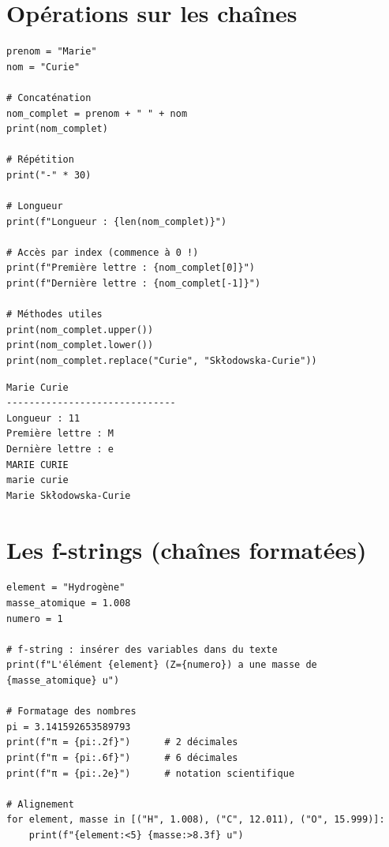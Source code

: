 \section{Op\'erations sur les cha\^ines}

\begin{codeblock}[title=\textbf{Python --- Cha\^ines de caract\`eres}]
\begin{verbatim}
prenom = "Marie"
nom = "Curie"

# Concaténation
nom_complet = prenom + " " + nom
print(nom_complet)

# Répétition
print("-" * 30)

# Longueur
print(f"Longueur : {len(nom_complet)}")

# Accès par index (commence à 0 !)
print(f"Première lettre : {nom_complet[0]}")
print(f"Dernière lettre : {nom_complet[-1]}")

# Méthodes utiles
print(nom_complet.upper())
print(nom_complet.lower())
print(nom_complet.replace("Curie", "Skłodowska-Curie"))
\end{verbatim}
\end{codeblock}

\begin{codeoutput}
\begin{verbatim}
Marie Curie
------------------------------
Longueur : 11
Première lettre : M
Dernière lettre : e
MARIE CURIE
marie curie
Marie Skłodowska-Curie
\end{verbatim}
\end{codeoutput}

\begin{center}
\end{center}

\section{Les f-strings (cha\^ines format\'ees)}

\begin{codeblock}[title=\textbf{Python --- f-strings}]
\begin{verbatim}
element = "Hydrogène"
masse_atomique = 1.008
numero = 1

# f-string : insérer des variables dans du texte
print(f"L'élément {element} (Z={numero}) a une masse de {masse_atomique} u")

# Formatage des nombres
pi = 3.141592653589793
print(f"π = {pi:.2f}")      # 2 décimales
print(f"π = {pi:.6f}")      # 6 décimales
print(f"π = {pi:.2e}")      # notation scientifique

# Alignement
for element, masse in [("H", 1.008), ("C", 12.011), ("O", 15.999)]:
    print(f"{element:<5} {masse:>8.3f} u")
\end{verbatim}
\end{codeblock}

